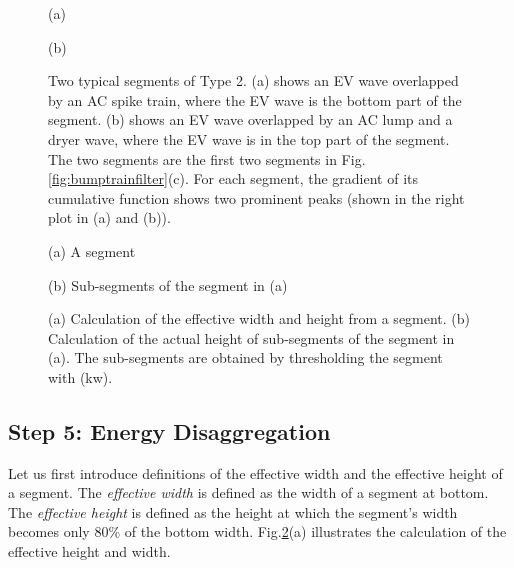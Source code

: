 \documentclass[conference]{IEEEtran}
\begin{document}
\begin{figure}[!t]
\begin{minipage}[b]{.48\linewidth}
  \centering
  \centerline{}
  \centerline{\footnotesize{(a)}}
\end{minipage}
\hfill
\begin{minipage}[b]{0.48\linewidth}
  \centering
  \centerline{}
  \centerline{\footnotesize{(b)}}
\end{minipage}
\caption{\footnotesize{Two typical segments of Type 2. (a) shows an EV wave overlapped by an AC spike train, where the EV wave is the bottom part of the segment. (b) shows an EV wave overlapped by an AC lump and a dryer wave, where the EV wave is in the top part of the segment. The two segments are the first two segments in Fig.\ref{fig:bumptrainfilter}(c). For each segment, the gradient of its cumulative function shows two prominent peaks (shown in the right plot in (a) and (b)).}}
\label{fig:type2}
\end{figure}






\begin{figure}[!t]
\begin{minipage}[b]{.48\linewidth}
  \centering
  \centerline{}
  \centerline{\footnotesize{(a) A segment}}
\end{minipage}
\hfill
\begin{minipage}[b]{0.48\linewidth}
  \centering
  \centerline{}
  \centerline{\footnotesize{(b) Sub-segments of the segment in (a)}}
\end{minipage}
\caption{\footnotesize{(a) Calculation of the effective width and height from a segment. (b) Calculation of the actual height of sub-segments of the segment in (a). The sub-segments are obtained by thresholding the segment with (kw).}}
\label{fig:EV_width}
\end{figure}





\subsection{Step 5: Energy Disaggregation}

Let us first introduce definitions of the effective width and the effective height of a segment. The \emph{effective width} is defined as the width of a segment at bottom. The \emph{effective height} is defined as the height at which the segment's width becomes only 80\% of the bottom width. Fig.\ref{fig:EV_width}(a) illustrates the calculation of the effective height and width.
\end{document}
